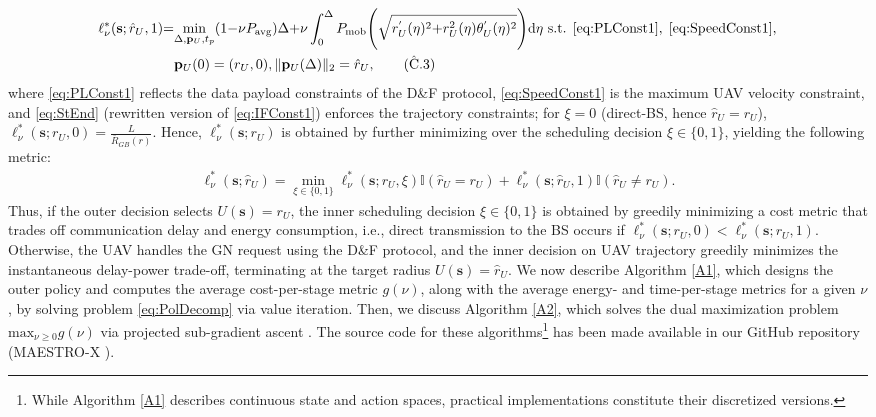 \documentclass[12pt, draftcls, onecolumn]{IEEEtran}
\theoremstyle{plain}
\theoremstyle{definition}
\theoremstyle{remark}
\begin{document}
\begin{align}
    \ell_{\nu}^{*}(\mathbf{s};\hat{r}_{U},1){=}&\underset{\Delta,\mathbf{p}_{U},t_{p}}{\mathrm{min}}(1{-}\nu P_{\mathrm{avg}})\Delta{+}\nu\int_{0}^{\Delta}P_{\mathrm{mob}}\Bigg(\sqrt{r_{U}^{'}(\eta)^{2}{+}r_{U}^{2}(\eta)\theta_{U}^{'}(\eta)^{2}}\Bigg)\mathrm{d}\eta \text{ s.t.}\;\, \text{\ref{eq:PLConst1}},\; \text{\ref{eq:SpeedConst1}},\label{eq:EllMin}\\
    &\mathbf{p}_{U}(0) =(r_U,0), \Vert \mathbf{p}_{U}(\Delta)\Vert_{2} =\hat{r}_U,\tag{$\hat{\text{C}}$.3}\label{eq:StEnd}\
\end{align}
where \ref{eq:PLConst1} reflects the data payload constraints of the D\&F protocol, \ref{eq:SpeedConst1} is the maximum UAV velocity constraint, and \ref{eq:StEnd} (rewritten version of \ref{eq:IFConst1}) enforces the trajectory constraints; for $\xi{=}0$ (direct-BS, hence $\hat{r}_{U}{=}r_{U}$), $\ell_{\nu}^{*}(\mathbf{s};r_{U},0){=}\frac{L}{\bar{R}_{GB}(r)}$. Hence, $\ell_{\nu}^{*}(\mathbf{s};r_{U})$ is obtained by further minimizing over the scheduling decision $\xi{\in}\{0,1\}$, yielding the following metric:
\begin{align}\label{ellnushatru}
	\ell_{\nu}^* (\mathbf{s}; \hat r_U) = \underset{\xi\in\{0,1\}}{\min} \ell_{\nu}^* (\mathbf{s}; r_U,\xi)\mathbb{I}(\hat r_U = r_U) + \ell_{\nu}^* (\mathbf{s}; \hat r_U, 1)\mathbb{I} (\hat r_U \neq r_U).
\end{align}
Thus, if the outer decision selects $U(\mathbf{s}){=}r_{U}$, the inner scheduling decision $\xi{\in}\{0,1\}$ is obtained by greedily minimizing 
a cost metric that trades off communication delay and energy consumption, i.e., direct transmission to the BS occurs if $\ell_{\nu}^{*}(\mathbf{s}; r_{U},0){<}\ell_{\nu}^{*}(\mathbf{s};r_{U},1)$. Otherwise, the UAV handles the GN request using the D\&F protocol, and the inner decision on UAV trajectory greedily minimizes the instantaneous delay-power trade-off, terminating at the target radius $U(\mathbf{s}){=}\hat{r}_{U}$. We now describe Algorithm \ref{A1}, which designs the outer policy and computes the average cost-per-stage metric $g(\nu)$, along with the average energy- and time-per-stage metrics for a given $\nu$, by solving problem \eqref{eq:PolDecomp} via value iteration. Then, we discuss Algorithm \ref{A2}, which solves the dual maximization problem $\mathrm{max}_{\nu{\geq}0}g(\nu)$ via projected sub-gradient ascent \cite{SubgradientMethods}. The source code for these algorithms\footnote{While Algorithm \ref{A1} describes continuous state and action spaces, practical implementations constitute their discretized versions.} has been made available in our GitHub repository (MAESTRO-X \cite{MAESTRO-X}).
\end{document}
